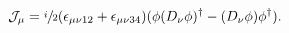 \begin{equation}\label{eq:current-uplus}
 \mathcal{J}_{\mu}=\sfrac{i}{2}(\epsilon_{\mu\nu12}+\epsilon_{\mu\nu34})
           (\phi(D_\nu\phi)^\dagger-(D_\nu\phi)\phi^\dagger).
\end{equation}

